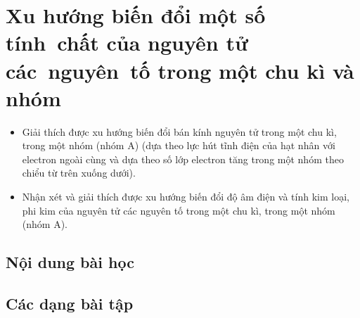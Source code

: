 \section[Xu hướng biến đổi một số tính chất]{Xu hướng biến đổi một số tính~chất của nguyên tử các~nguyên~tố trong một \newline chu kì và nhóm}
\vspace{1.25cm}
\begin{Muctieu}
	\begin{itemize}
		\item  Giải thích được xu hướng biến đổi bán kính nguyên tử trong một chu kì, trong một nhóm (nhóm A) (dựa theo lực hút tĩnh điện của hạt nhân với electron ngoài cùng và dựa theo số lớp electron tăng trong một nhóm theo chiểu từ trên xuống dưới).
		\item  Nhận xét và giải thích được xu hướng biến đổi độ âm điện và tính kim loại, phi kim của nguyên tử các nguyên tố trong một chu kì, trong một nhóm (nhóm A).
	\end{itemize}
\end{Muctieu}
\begin{kd}
\end{kd}
\subsection{Nội dung bài học}
	
\subsection{Các dạng bài tập}
	